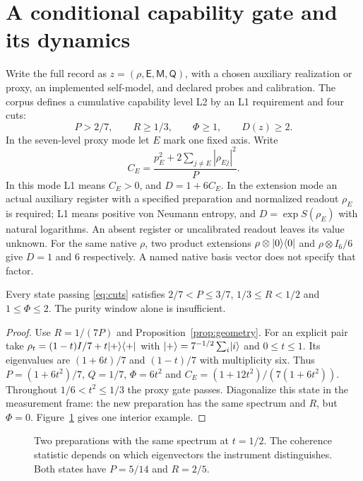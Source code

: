 \section{A conditional capability gate and its dynamics}
Write the full record as $z=(\rho,\mathsf E,\mathsf M,\mathsf Q)$, with a chosen auxiliary realization or proxy, an implemented self-model, and declared probes and calibration. The corpus defines a cumulative capability level L2 by an L1 requirement and four cuts:
\begin{equation}
 P>2/7,\qquad R\ge1/3,\qquad \Phi\ge1,\qquad D(z)\ge2.
\label{eq:cuts}
\end{equation}
In the seven-level proxy mode let $E$ mark one fixed axis. Write
\[
 C_E=\frac{p_E^2+2\sum_{j\ne E}|\rho_{Ej}|^2}{P}.
\]
In this mode L1 means $C_E>0$, and $D=1+6C_E$. In the extension mode an actual auxiliary register with a specified preparation and normalized readout $\rho_E$ is required; L1 means positive von Neumann entropy, and $D=\exp S(\rho_E)$ with natural logarithms. An absent register or uncalibrated readout leaves its value unknown. For the same native $\rho$, two product extensions $\rho\otimes\lvert 0\rangle\langle 0\rvert$ and $\rho\otimes I_6/6$ give $D=1$ and $6$ respectively. A named native basis vector does not specify that factor.

\begin{proposition}
Every state passing \eqref{eq:cuts} satisfies $2/7<P\le3/7$, $1/3\le R<1/2$ and $1\le\Phi\le2$. The purity window alone is insufficient.
\end{proposition}
\begin{proof}
Use $R=1/(7P)$ and Proposition~\ref{prop:geometry}. For an explicit pair take $\rho_t=(1-t)I/7+t\lvert +\rangle\langle +\rvert$ with $\lvert +\rangle=7^{-1/2}\sum_i\lvert i\rangle$ and $0\le t\le1$. Its eigenvalues are $(1+6t)/7$ and $(1-t)/7$ with multiplicity six. Thus $P=(1+6t^2)/7$, $Q=1/7$, $\Phi=6t^2$ and $C_E=(1+12t^2)/(7(1+6t^2))$. Throughout $1/6<t^2\le1/3$ the proxy gate passes. Diagonalize this state in the measurement frame: the new preparation has the same spectrum and $R$, but $\Phi=0$. Figure~\ref{fig:controls} gives one interior example.
\end{proof}
\begin{figure}[htbp]\centering

\caption{Two preparations with the same spectrum at $t=1/2$. The coherence statistic depends on which eigenvectors the instrument distinguishes. Both states have $P=5/14$ and $R=2/5$.}\label{fig:controls}
\end{figure}

